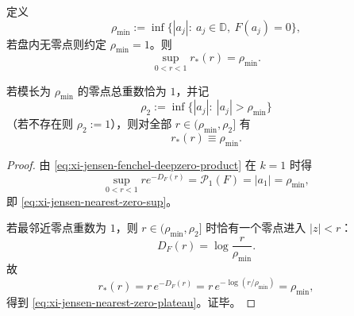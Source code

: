 \begin{proposition}[最邻近盘零点的平台刚性与单零点可检出性]\label{prop:xi-jensen-nearest-zero-platform-rigidity}
定义
\[
\rho_{\min}:=\inf\{|a_j|:\ a_j\in\mathbb D,\ F(a_j)=0\},
\]
若盘内无零点则约定 \(\rho_{\min}=1\)。则
\begin{equation}\label{eq:xi-jensen-nearest-zero-sup}
\boxed{\;
\sup_{0<r<1}r_\ast(r)=\rho_{\min}. \;}
\end{equation}

若模长为 \(\rho_{\min}\) 的零点总重数恰为 \(1\)，并记
\[
\rho_2:=\inf\{|a_j|:\ |a_j|>\rho_{\min}\}
\]
（若不存在则 \(\rho_2:=1\)），则对全部 \(r\in(\rho_{\min},\rho_2]\) 有
\begin{equation}\label{eq:xi-jensen-nearest-zero-plateau}
\boxed{\;
r_\ast(r)\equiv \rho_{\min}. \;}
\end{equation}
\end{proposition}
\begin{proof}
由 \eqref{eq:xi-jensen-fenchel-deepzero-product} 在 \(k=1\) 时得
\[
\sup_{0<r<1}r e^{-D_F(r)}=\mathcal P_1(F)=|a_1|=\rho_{\min},
\]
即 \eqref{eq:xi-jensen-nearest-zero-sup}。

若最邻近零点重数为 \(1\)，则 \(r\in(\rho_{\min},\rho_2]\) 时恰有一个零点进入 \(|z|<r\)：
\[
D_F(r)=\log\frac{r}{\rho_{\min}}.
\]
故
\[
r_\ast(r)=r\,e^{-D_F(r)}
=r\,e^{-\log(r/\rho_{\min})}
=\rho_{\min},
\]
得到 \eqref{eq:xi-jensen-nearest-zero-plateau}。证毕。
\end{proof}

